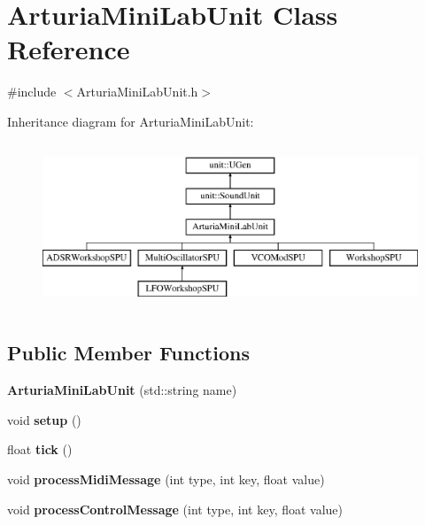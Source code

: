 \hypertarget{classArturiaMiniLabUnit}{}\section{Arturia\+Mini\+Lab\+Unit Class Reference}
\label{classArturiaMiniLabUnit}


{\ttfamily \#include $<$Arturia\+Mini\+Lab\+Unit.\+h$>$}

Inheritance diagram for Arturia\+Mini\+Lab\+Unit\+:\begin{figure}[H]
\begin{center}
\leavevmode
\includegraphics[height=5.000000cm]{classArturiaMiniLabUnit}
\end{center}
\end{figure}
\subsection*{Public Member Functions}
\begin{DoxyCompactItemize}
\item 
{\bfseries Arturia\+Mini\+Lab\+Unit} (std\+::string name)\hypertarget{classArturiaMiniLabUnit_aeb63b33d9631976240fd38d36935b44c}{}\label{classArturiaMiniLabUnit_aeb63b33d9631976240fd38d36935b44c}

\item 
void {\bfseries setup} ()\hypertarget{classArturiaMiniLabUnit_ae7590bc31683c4dc12b0a1396c53c6b4}{}\label{classArturiaMiniLabUnit_ae7590bc31683c4dc12b0a1396c53c6b4}

\item 
float {\bfseries tick} ()\hypertarget{classArturiaMiniLabUnit_a5d9365ac51fa7f46fdbd53c4f473bfcd}{}\label{classArturiaMiniLabUnit_a5d9365ac51fa7f46fdbd53c4f473bfcd}

\item 
void {\bfseries process\+Midi\+Message} (int type, int key, float value)\hypertarget{classArturiaMiniLabUnit_a0bb1d1b81bb3faf7ee141b941cf84457}{}\label{classArturiaMiniLabUnit_a0bb1d1b81bb3faf7ee141b941cf84457}

\item 
void {\bfseries process\+Control\+Message} (int type, int key, float value)\hypertarget{classArturiaMiniLabUnit_ad8f03d0e1bbe21f115f99c156c0f2d06}{}\label{classArturiaMiniLabUnit_ad8f03d0e1bbe21f115f99c156c0f2d06}

\end{DoxyCompactItemize}
